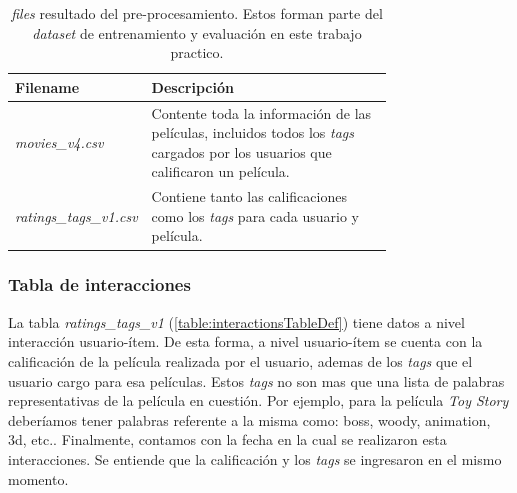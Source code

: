 \documentclass[11pt,a4paper,twoside]{thesis}
\begin{document}
\begin{table}[!htb]
	\centering
	\footnotesize
	\begin{tabular}{l | p{0.75\linewidth}}
		\hline
		Filename                       & Descripción                                                                                                                             \\
		\hline
		\textit{movies\_v4.csv}        & Contente toda la información de las películas, incluidos todos los \textit{tags} cargados por los usuarios que calificaron un película. \\
		\textit{ratings\_tags\_v1.csv} & Contiene tanto las calificaciones como los \textit{tags} para cada usuario y película.                                                  \\
		\hline
	\end{tabular}
	\caption{
		\textit{files} resultado del pre-procesamiento. Estos forman parte del \textit{dataset} de entrenamiento y evaluación en este trabajo practico.
	}
	\label{table:tableFiles}
\end{table}

\subsubsection{Tabla de interacciones}

La tabla \textit{ratings\_tags\_v1} (\ref{table:interactionsTableDef}) tiene
datos a nivel interacción usuario-ítem. De esta forma, a nivel usuario-ítem se
cuenta con la calificación de la película realizada por el usuario, ademas de
los \textit{tags} que el usuario cargo para esa películas. Estos \textit{tags}
no son mas que una lista de palabras representativas de la película en
cuestión. Por ejemplo, para la película \textit{Toy Story} deberíamos tener
palabras referente a la misma como: boss, woody, animation, 3d, etc..
Finalmente, contamos con la fecha en la cual se realizaron esta interacciones.
Se entiende que la calificación y los \textit{tags} se ingresaron en el mismo
momento.
\end{document}
